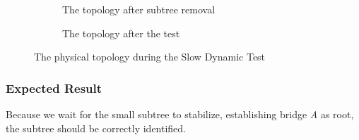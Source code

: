 \begin{figure}[hp]
\begin{center}
\begin{subfigure}[b]{0.4\textwidth}
            \caption{The topology after subtree removal}
            \label{fig:sdcTest3}
        \end{subfigure}
        \hspace{1cm}
        \begin{subfigure}[b]{0.4\textwidth}
            \caption{The topology after the test}
            \label{fig:sdcTest5}
       \end{subfigure}
    \end{center}
    \caption{The physical topology during the Slow Dynamic Test}
    \label{fig:sdcTest}
\end{figure}

\subsubsection*{Expected Result}
Because we wait for the small subtree to stabilize, establishing bridge \textit{A} as root, the subtree should be correctly identified.

